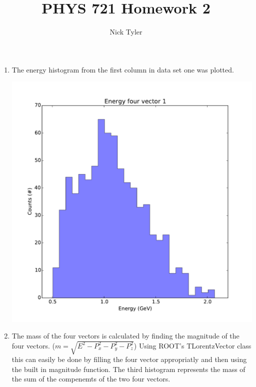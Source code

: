 \documentclass[pdftex]{article}
\title{PHYS 721 Homework 2}
\author{Nick Tyler}
\date{}
\begin{document}
\maketitle
\begin{enumerate}
	\item The energy histogram from the first column in data set one was plotted. \\
	\parbox{\linewidth}{\centering
		\includegraphics[scale=0.5]{Problem_1.pdf}\\
	}
	\newpage
	\item The mass of the four vectors is calculated by finding the magnitude of the four vectors. 
	($m = \sqrt{E^2 - P_x^2 - P_y^2 - P_z^2}$)
	Using ROOT's TLorentzVector class this can easily be done by filling the four vector appropriatly
	and then using the built in magnitude function.  The third histogram represents the mass of the sum of the compenemts
	of the two four vectors.\\
	\parbox{\linewidth}{\centering
}
\end{enumerate}
\end{document}
